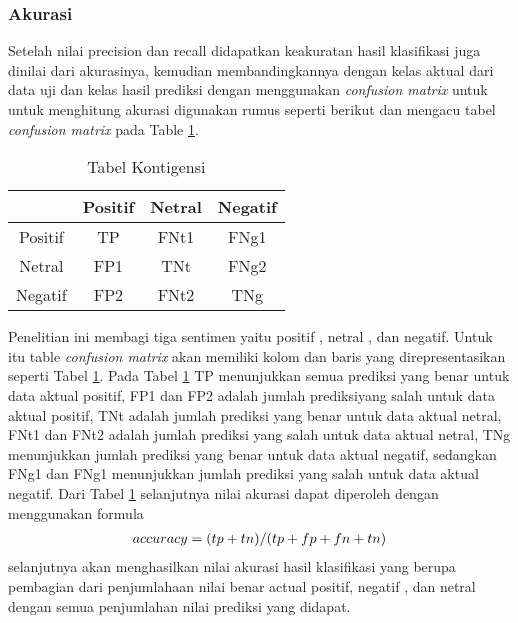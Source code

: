 \subsubsection*{Akurasi}
Setelah nilai precision dan recall didapatkan keakuratan hasil klasifikasi juga dinilai dari akurasinya, kemudian membandingkannya dengan kelas aktual dari data uji dan kelas hasil prediksi dengan menggunakan \textit{confusion matrix} untuk untuk menghitung akurasi digunakan rumus seperti berikut dan mengacu tabel \textit{confusion matrix} pada Table \ref{tab:konsep}. 

\begin{table}[hbt]
	\caption{Tabel Kontigensi}
	\centering
	\begin{adjustbox}{max width=\textwidth}
		\begin{tabular}{*{4}{c}}%
			\toprule
			 & Positif & Netral & Negatif \\
			\midrule
			Positif & TP & FNt1 & FNg1 \\
			Netral & FP1 & TNt & FNg2 \\
			Negatif & FP2 & FNt2 & TNg \\
			\bottomrule
		\end{tabular}
	\end{adjustbox}
	\label{tab:konsep}
\end{table}

Penelitian ini membagi tiga sentimen yaitu positif , netral , dan negatif. Untuk itu table \textit{confusion matrix} akan memiliki kolom dan baris yang direpresentasikan seperti Tabel \ref{tab:konsep}. Pada Tabel \ref{tab:konsep} TP menunjukkan semua prediksi yang benar untuk data aktual positif, FP1 dan FP2 adalah jumlah prediksiyang salah untuk data aktual positif, TNt adalah jumlah prediksi yang benar untuk data aktual netral, FNt1 dan FNt2 adalah jumlah prediksi yang salah untuk data aktual netral, TNg menunjukkan jumlah prediksi yang benar untuk data aktual negatif, sedangkan FNg1 dan FNg1 menunjukkan jumlah prediksi yang salah untuk data aktual negatif. Dari Tabel \ref{tab:konsep} selanjutnya nilai akurasi dapat diperoleh dengan menggunakan formula
\begin{equation}
\begin{split}
\tiny
accuracy = (tp+tn)/(tp+fp+fn+tn)
\label{eq:akurasi}
\normalsize
\end{split}
\end{equation}
selanjutnya akan menghasilkan nilai akurasi hasil klasifikasi yang berupa pembagian dari penjumlahaan nilai benar actual positif, negatif , dan netral dengan semua penjumlahan nilai prediksi yang didapat.

